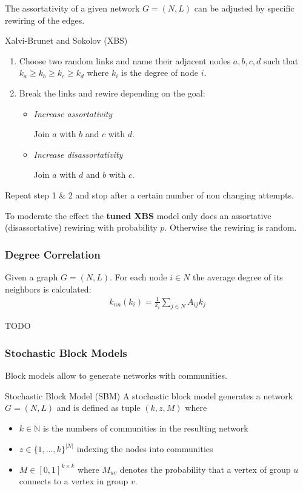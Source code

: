 \documentclass[english]{panikzettel}
\begin{document}
The assortativity of a given network $ G = (N,L) $ can be adjusted by specific rewiring of the edges.

\begin{algo}{Xalvi-Brunet and Sokolov (XBS)}
\begin{enumerate}
	\item Choose two random links and name their adjacent nodes $ a,b,c,d $ such that $ k_a \geq k_b \geq k_c \geq k_d $ where $ k_i $ is the degree of node $ i $.
	\item Break the links and rewire depending on the goal:
	\begin{itemize}
		\item \textit{Increase assortativity}
		
		Join $ a $ with $ b $ and $ c $ with $ d $.
		
		\item \textit{Increase disassortativity}
		
		Join $ a $ with $ d $ and $ b $ with $ c $.
	\end{itemize}
\end{enumerate}
Repeat step 1 \& 2  and stop after a certain number of non changing attempts.
\end{algo}

To moderate the effect the \textbf{tuned XBS} model only does an assortative (disassortative) rewiring with probability $ p $.
Otherwise the rewiring is random.

\subsubsection{Degree Correlation}
Given a graph $ G = (N,L) $. 
For each node $ i \in N $ the average degree of its neighbors is calculated:
\begin{align*}
	k_{nn} (k_i) = \frac{1}{k_i} \sum\limits_{j \in N} A_{ij} k_j
\end{align*}

TODO

\subsubsection{Stochastic Block Models}
Block models allow to generate networks with communities.

\begin{defi}{Stochastic Block Model (SBM)}
A stochastic block model generates a network $ G = (N,L) $ and is defined as tuple $ (k,z,M) $ where
\begin{itemize}
	\item $ k \in \mathbb{N} $ is the numbers of communities in the resulting network
	\item $ z \in \{1, \dots, k\}^{|N|} $ indexing the nodes into communities
	\item $ M \in [0,1]^{k \times k} $ where $ M_{uv} $ denotes the probability that a vertex of group $ u $ connects to a vertex in group $ v $.
\end{itemize}
\end{defi}
\end{document}
